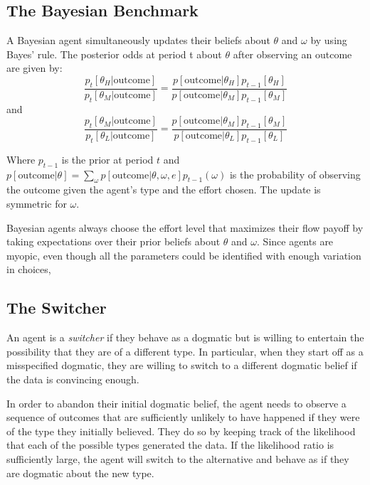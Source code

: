 \documentclass[
  12pt,
]{article}
\begin{document}
\hypertarget{the-bayesian-benchmark}{%
\subsection{The Bayesian Benchmark}\label{the-bayesian-benchmark}}

A Bayesian agent simultaneously updates their beliefs about \(\theta\)
and \(\omega\) by using Bayes' rule. The posterior odds at period t
about \(\theta\) after observing an outcome are given by:
\begin{equation}
\frac{p_{t}[\theta_H|\text{outcome}]}{p_{t}[\theta_M|\text{outcome}]} = 
      \frac{p[\text{outcome}|\theta_H]p_{t-1}[\theta_H]}{p[\text{outcome}|\theta_M]p_{t-1}[\theta_M]}
\end{equation} and \begin{equation}
\frac{p_{t}[\theta_M|\text{outcome}]}{p_{t}[\theta_L|\text{outcome}]} = 
      \frac{p[\text{outcome}|\theta_M]p_{t-1}[\theta_M]}{p[\text{outcome}|\theta_L]p_{t-1}[\theta_L]}
\end{equation}

Where \(p_{t-1}\) is the prior at period \(t\) and
\(p[\text{outcome}|\theta] = \sum_{\omega} p[\text{outcome}|\theta, \omega, e]p_{t-1}(\omega)\)
is the probability of observing the outcome given the agent's type and
the effort chosen. The update is symmetric for \(\omega\).

Bayesian agents always choose the effort level that maximizes their flow
payoff by taking expectations over their prior beliefs about \(\theta\)
and \(\omega\). Since agents are myopic, even though all the parameters
could be identified with enough variation in choices,

\hypertarget{the-switcher}{%
\subsection{The Switcher}\label{the-switcher}}

An agent is a \emph{switcher} if they behave as a dogmatic but is
willing to entertain the possibility that they are of a different type.
In particular, when they start off as a misspecified dogmatic, they are
willing to switch to a different dogmatic belief if the data is
convincing enough.

In order to abandon their initial dogmatic belief, the agent needs to
observe a sequence of outcomes that are sufficiently unlikely to have
happened if they were of the type they initially believed. They do so by
keeping track of the likelihood that each of the possible types
generated the data. If the likelihood ratio is sufficiently large, the
agent will switch to the alternative and behave as if they are dogmatic
about the new type.
\end{document}
